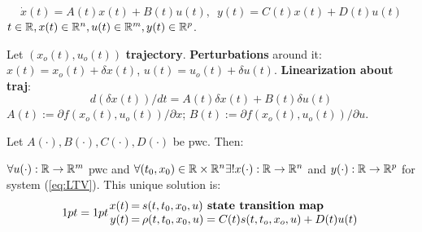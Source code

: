 \vspace{-2mm}
\begin{equation}\label{eq:LTV}
\dot x(t)=A(t)x(t)+B(t)u(t),\,\,\,
y(t) = C(t)x(t)+D(t)u(t)
\end{equation}
$t\in\mathbb R,x(t)\in\mathbb R^n,u(t)\in\mathbb R^m,y(t)\in\mathbb R^p$.

\begin{Definition}
Let $(x_o(t),u_o(t))$ \textbf{trajectory}. \textbf{Perturbations} around it: $x(t)=x_o(t)+\delta x(t)$, $u(t)=u_o(t)+\delta u(t)$. \textbf{Linearization about traj}:
\begin{equation*}
d(\delta x(t))/dt=A(t)\delta x(t)+B(t)\delta u(t)
\end{equation*}
$A(t):=\partial f(x_o(t),u_o(t))/\partial x$; $B(t):=\partial f(x_o(t),u_o(t))/\partial u$.
\end{Definition}
Let $A(\cdot),B(\cdot),C(\cdot),D(\cdot)$ be pwc. Then:
\begin{Fact}
$\forall u(\cdot):\mathbb R\to\mathbb R^m$ pwc and $\forall(t_0,x_0)\in\mathbb R\times\mathbb R^n\exists ! x(\cdot):\mathbb R\to\mathbb R^n$ and $y(\cdot):\mathbb R\to\mathbb R^p$ for system (\ref{eq:LTV}). This unique solution is:
\begin{equation*}
\arraycolsep=1pt
\begin{array}{rlll}
x(t) &=& s(t,t_0,x_0,u)\textbf{ state transition map}&  \\
y(t) &=& \rho(t,t_0,x_0,u)=C(t)s(t,t_o,x_o,u)+D(t)u(t) & \\
\end{array}
\end{equation*}
\end{Fact}
